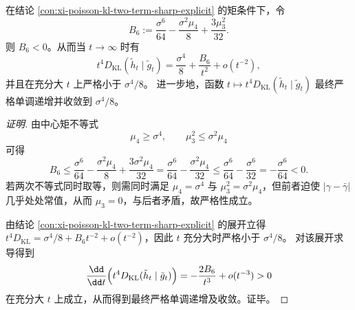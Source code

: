 

\begin{conclusion}\label{con:xi-poisson-kl-sixth-coefficient-strict-negativity}
在结论 \ref{con:xi-poisson-kl-two-term-sharp-explicit} 的矩条件下，令
\[
B_6:=\frac{\sigma^6}{64}-\frac{\sigma^2\mu_4}{8}+\frac{3\mu_3^2}{32}.
\]
则 \(B_6<0\)。从而当 \(t\to\infty\) 时有
\[
t^4D_{\mathrm{KL}}(\tilde h_t\mid \tilde g_t)=\frac{\sigma^4}{8}+\frac{B_6}{t^2}+o(t^{-2}),
\]
并且在充分大 \(t\) 上严格小于 \(\sigma^4/8\)。
进一步地，函数 \(t\mapsto t^4D_{\mathrm{KL}}(\tilde h_t\mid \tilde g_t)\) 最终严格单调递增并收敛到 \(\sigma^4/8\)。
\end{conclusion}
\begin{proof}[证明]
由中心矩不等式
\[
\mu_4\ge \sigma^4,\qquad
\mu_3^2\le \sigma^2\mu_4
\]
可得
\[
B_6
\le \frac{\sigma^6}{64}-\frac{\sigma^2\mu_4}{8}+\frac{3\sigma^2\mu_4}{32}
=\frac{\sigma^6}{64}-\frac{\sigma^2\mu_4}{32}
\le \frac{\sigma^6}{64}-\frac{\sigma^6}{32}
=-\frac{\sigma^6}{64}<0.
\]
若两次不等式同时取等，则需同时满足 \(\mu_4=\sigma^4\) 与 \(\mu_3^2=\sigma^2\mu_4\)，但前者迫使 \(|\gamma-\bar\gamma|\) 几乎处处常值，从而 \(\mu_3=0\)，与后者矛盾，故严格性成立。

由结论 \ref{con:xi-poisson-kl-two-term-sharp-explicit} 的展开立得
\(
t^4D_{\mathrm{KL}}=\sigma^4/8+B_6t^{-2}+o(t^{-2})
\)，因此 \(t\) 充分大时严格小于 \(\sigma^4/8\)。
对该展开求导得到
\[
\frac{\dd}{\dd t}\Bigl(t^4D_{\mathrm{KL}}(\tilde h_t\mid \tilde g_t)\Bigr)
=-\frac{2B_6}{t^3}+o(t^{-3})>0
\]
在充分大 \(t\) 上成立，从而得到最终严格单调递增及收敛。证毕。
\end{proof}

